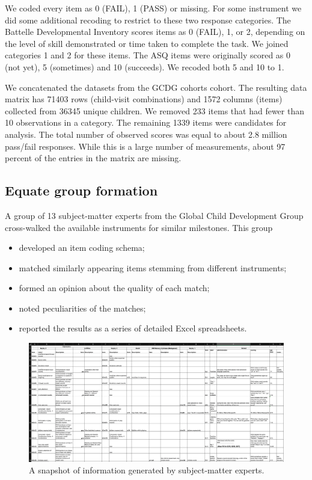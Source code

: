 \documentclass[
]{book}
\providecommand{\tightlist}{%
  \setlength{\itemsep}{0pt}\setlength{\parskip}{0pt}}
\begin{document}
We coded every item as 0 (FAIL), 1 (PASS) or missing. For some instrument we did some additional recoding to restrict to these two response categories. The Battelle Developmental Inventory scores items as 0 (FAIL), 1, or 2, depending on the level of skill demonstrated or time taken to complete the task. We joined categories 1 and 2 for these items. The ASQ items were originally scored as 0 (not yet), 5 (sometimes) and 10 (succeeds). We recoded both 5 and 10 to 1.

We concatenated the datasets from the GCDG cohorts cohort. The resulting data matrix has 71403 rows (child-visit combinations) and 1572 columns (items) collected from 36345 unique children. We removed 233 items that had fewer than 10 observations in a category. The remaining 1339 items were candidates for analysis. The total number of observed scores was equal to about 2.8 million pass/fail responses. While this is a large number of measurements, about 97 percent of the entries in the matrix are missing.

\hypertarget{equate-group-formation}{%
\subsection{Equate group formation}\label{equate-group-formation}}

A group of 13 subject-matter experts from the Global Child Development Group cross-walked the available instruments for similar milestones. This group

\begin{itemize}
\tightlist
\item
  developed an item coding schema;
\item
  matched similarly appearing items stemming from different instruments;
\item
  formed an opinion about the quality of each match;
\item
  noted peculiarities of the matches;
\item
  reported the results as a series of detailed Excel spreadsheets.
\end{itemize}

\begin{figure}

{\centering \includegraphics[width=1\linewidth]{fig/equate_excel} 

}

\caption{A snapshot of information generated by subject-matter experts.}\label{fig:equatesheetpic}
\end{figure}
\end{document}
